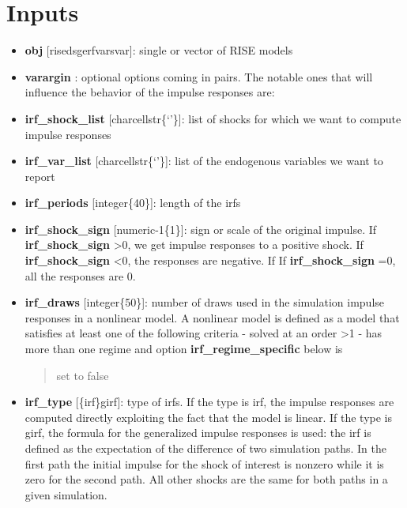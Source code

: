 \documentclass[letterpaper,10pt,english]{sphinxmanual}
\begin{document}
\section{Inputs}
\label{classes/models/@svar/svar:id30}\begin{itemize}
\item {} 
\textbf{obj} {[}rise\textbar{}dsge\textbar{}rfvar\textbar{}svar{]}: single or vector of RISE models

\item {} 
\textbf{varargin} : optional options coming in pairs. The notable ones that
will influence the behavior of the impulse responses are:

\item {} 
\textbf{irf\_shock\_list} {[}char\textbar{}cellstr\textbar{}\{`'\}{]}: list of shocks for which we
want to compute impulse responses

\item {} 
\textbf{irf\_var\_list} {[}char\textbar{}cellstr\textbar{}\{`'\}{]}: list of the endogenous variables
we want to report

\item {} 
\textbf{irf\_periods} {[}integer\textbar{}\{40\}{]}: length of the irfs

\item {} 
\textbf{irf\_shock\_sign} {[}numeric\textbar{}-1\textbar{}\{1\}{]}: sign or scale of the original
impulse. If \textbf{irf\_shock\_sign} \textgreater{}0, we get impulse responses to a
positive shock. If \textbf{irf\_shock\_sign} \textless{}0, the responses are negative.
If If \textbf{irf\_shock\_sign} =0, all the responses are 0.

\item {} 
\textbf{irf\_draws} {[}integer\textbar{}\{50\}{]}: number of draws used in the simulation
impulse responses in a nonlinear model. A nonlinear model is defined as
a model that satisfies at least one of the following criteria
- solved at an order \textgreater{}1
- has more than one regime and option \textbf{irf\_regime\_specific} below is
\begin{quote}

set to false
\end{quote}

\item {} 
\textbf{irf\_type} {[}\{irf\}\textbar{}girf{]}: type of irfs. If the type is irf, the
impulse responses are computed directly exploiting the fact that the
model is linear. If the type is girf, the formula for the generalized
impulse responses is used: the irf is defined as the expectation of the
difference of two simulation paths. In the first path the initial
impulse for the shock of interest is nonzero while it is zero for the
second path. All other shocks are the same for both paths in a given
simulation.


\end{itemize}
\end{document}
